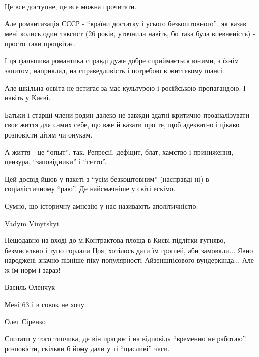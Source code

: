 Це все доступне, це все можна прочитати. 

Але романтизація СССР  -  \enquote{країни достатку і усього  безкоштовного}, як казав
мені колись один таксист (26 років, уточнила навіть, бо така була впевненість)
- просто таки процвітає. 

І ця фальшива романтика справді  дуже добре сприймається юними, з їхнім
запитом, наприклад, на справедливість і потребою в життєвому шансі.

Але шкільна освіта не встигає  за мас-культурою і російською  пропагандою. І навіть у Києві. 

Батьки і старші члени родин далеко не завжди  здатні критично  проаналізувати
своє життя для самих себе, що вже й казати про те, щоб адекватно і цікаво
розповісти дітям чи онукам.

А життя - це \enquote{опыт}, так. Репресії, дефіцит, блат, хамство і приниження, цензура, \enquote{заповідники} і \enquote{гетто}. 

Цей досвід йшов у пакеті з \enquote{усім безкоштовним} (насправді ні) в соціалістичному
\enquote{раю}. Де найсмачніше у світі ескімо.

Сумно, що історичну амнезію у нас називають аполітичністю.

Vadym Vinytskyi

Нещодавно на вході до м.Контрактова площа в Києві підлітки гугняво, безмисельно
і тупо горлали Цоя, хотілось дати їм грошей, аби замовкли... Явно народжені
значно пізніше піку популярності Айзеншпісового вундеркінда... Але ж їм норм і
зараз!

Василь Оленчук

Мені 63 і в совок не хочу.

Олег Сіренко

Спитати у того типчика, де він працює і на відповідь \enquote{временно не работаю}
розповісти, скільки б йому дали у ті \enquote{щасливі} часи.
